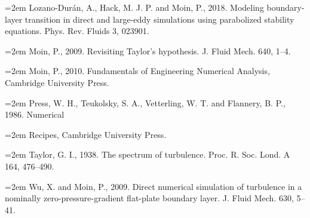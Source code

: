 \documentclass[12pt,a4paper,openany,fontset=none]{ctexbook}
\begin{document}
\par\hangindent=2em Lozano-Durán, A., Hack, M. J. P. and Moin, P., 2018. Modeling boundary-layer transition in direct and large-eddy simulations using parabolized stability equations. Phys. Rev. Fluids 3, 023901.
\par\hangindent=2em Moin, P., 2009. Revisiting Taylor’s hypothesis. J. Fluid Mech. 640, 1–4.
\par\hangindent=2em Moin, P., 2010. Fundamentals of Engineering Numerical Analysis, Cambridge University Press.
\par\hangindent=2em Press, W. H., Teukolsky, S. A., Vetterling, W. T. and Flannery, B. P., 1986. Numerical
\par\hangindent=2em Recipes, Cambridge University Press.
\par\hangindent=2em Taylor, G. I., 1938. The spectrum of turbulence. Proc. R. Soc. Lond. A 164, 476–490.
\par\hangindent=2em Wu, X. and Moin, P., 2009. Direct numerical simulation of turbulence in a nominally zero-pressure-gradient flat-plate boundary layer. J. Fluid Mech. 630, 5–41.
\end{document}
